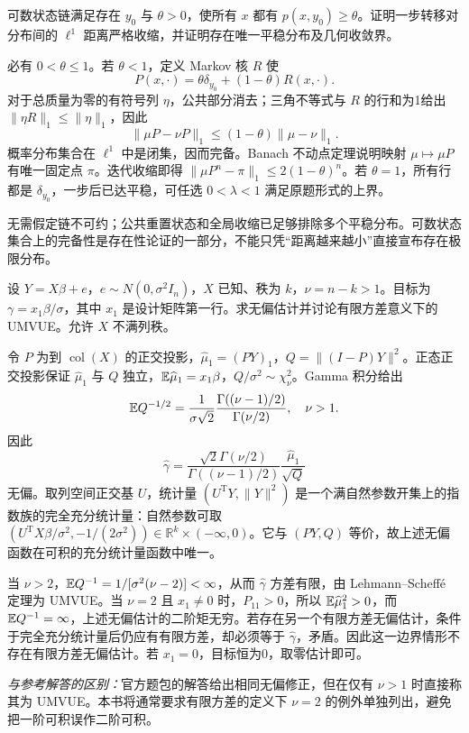 \begin{example}[原题4：共同重置状态产生的收缩]\label{yau:2022-4}
可数状态链满足存在 $y_0$ 与 $\theta>0$，使所有 $x$ 都有 $p(x,y_0)\ge\theta$。证明一步转移对分布间的 $\ell^1$ 距离严格收缩，并证明存在唯一平稳分布及几何收敛界。
\end{example}
\begin{solve}
必有 $0<\theta\le1$。若 $\theta<1$，定义 Markov 核 $R$ 使
\[
P(x,\cdot)=\theta\delta_{y_0}+(1-\theta)R(x,\cdot).
\]
对于总质量为零的有符号列 $\eta$，公共部分消去；三角不等式与 $R$ 的行和为1给出 $\|\eta R\|_1\le\|\eta\|_1$，因此
\[
\|\mu P-\nu P\|_1\le(1-\theta)\|\mu-\nu\|_1.
\]
概率分布集合在 $\ell^1$ 中是闭集，因而完备。Banach 不动点定理说明映射 $\mu\mapsto\mu P$ 有唯一固定点 $\pi$。迭代收缩即得 $\|\mu P^n-\pi\|_1\le2(1-\theta)^n$。若 $\theta=1$，所有行都是 $\delta_{y_0}$，一步后已达平稳，可任选 $0<\lambda<1$ 满足原题形式的上界。

无需假定链不可约；公共重置状态和全局收缩已足够排除多个平稳分布。可数状态集合上的完备性是存在性论证的一部分，不能只凭“距离越来越小”直接宣布存在极限分布。
\end{solve}

\begin{example}[原题5：正态线性模型中的标准化均值]\label{yau:2022-5}
设 $Y=X\beta+e$，$e\sim N(0,\sigma^2I_n)$，$X$ 已知、秩为 $k$，$\nu=n-k>1$。目标为 $\gamma=x_1\beta/\sigma$，其中 $x_1$ 是设计矩阵第一行。求无偏估计并讨论有限方差意义下的 UMVUE。允许 $X$ 不满列秩。
\end{example}
\begin{solve}
令 $P$ 为到 $\operatorname{col}(X)$ 的正交投影，$\widehat\mu_1=(PY)_1$，$Q=\|(I-P)Y\|^2$。正态正交投影保证 $\widehat\mu_1$ 与 $Q$ 独立，$\mathbb E\widehat\mu_1=x_1\beta$，$Q/\sigma^2\sim\chi^2_\nu$。Gamma 积分给出
\[
\mathbb E Q^{-1/2}=\frac1{\sigma\sqrt2}\frac{\Gamma((\nu-1)/2)}{\Gamma(\nu/2)},\quad \nu>1.
\]
因此
\[
\widehat\gamma=\frac{\sqrt2\Gamma(\nu/2)}{\Gamma((\nu-1)/2)}\frac{\widehat\mu_1}{\sqrt Q}
\]
无偏。取列空间正交基 $U$，统计量 $(U^{\mathrm T}Y,\|Y\|^2)$ 是一个满自然参数开集上的指数族的完全充分统计量：自然参数可取 $(U^{\mathrm T}X\beta/\sigma^2,-1/(2\sigma^2))\in\mathbb R^k\times(-\infty,0)$。它与 $(PY,Q)$ 等价，故上述无偏函数在可积的充分统计量函数中唯一。

当 $\nu>2$，$\mathbb E Q^{-1}=1/[\sigma^2(\nu-2)]<\infty$，从而 $\widehat\gamma$ 方差有限，由 Lehmann--Scheffé 定理为 UMVUE。当 $\nu=2$ 且 $x_1\ne0$ 时，$P_{11}>0$，所以 $\mathbb E\widehat\mu_1^2>0$，而 $\mathbb E Q^{-1}=\infty$，上述无偏估计的二阶矩无穷。若存在另一个有限方差无偏估计，条件于完全充分统计量后仍应有有限方差，却必须等于 $\widehat\gamma$，矛盾。因此这一边界情形不存在有限方差无偏估计。若 $x_1=0$，目标恒为0，取零估计即可。

\emph{与参考解答的区别：}官方题包的解答给出相同无偏修正，但在仅有 $\nu>1$ 时直接称其为 UMVUE。本书将通常要求有限方差的定义下 $\nu=2$ 的例外单独列出，避免把一阶可积误作二阶可积。
\end{solve}

